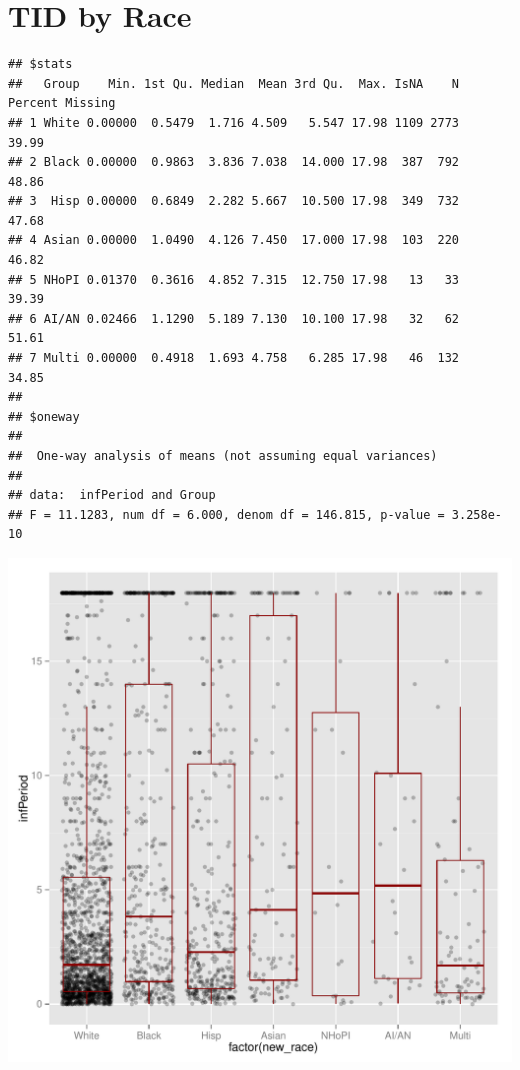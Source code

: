 \documentclass{article}\usepackage[]{graphicx}\usepackage[]{color}
\makeatletter
\def\maxwidth{ %
  \ifdim\Gin@nat@width>\linewidth
    \linewidth
  \else
    \Gin@nat@width
  \fi
}
\newenvironment{kframe}{%
 \def\at@end@of@kframe{}%
 \ifinner\ifhmode%
  \def\at@end@of@kframe{\end{minipage}}%
  \begin{minipage}{\columnwidth}%
 \fi\fi%
 \def\FrameCommand##1{\hskip\@totalleftmargin \hskip-\fboxsep
 \colorbox{shadecolor}{##1}\hskip-\fboxsep
     \hskip-\linewidth \hskip-\@totalleftmargin \hskip\columnwidth}%
 \MakeFramed {\advance\hsize-\width
   \@totalleftmargin\z@ \linewidth\hsize
   \@setminipage}}%
 {\par\unskip\endMakeFramed%
 \at@end@of@kframe}
\newenvironment{knitrout}{}{} %
\makeatother
\begin{document}
\section{TID by Race}

\begin{knitrout}\footnotesize
{}\color{fgcolor}\begin{kframe}
\begin{verbatim}
## $stats
##   Group    Min. 1st Qu. Median  Mean 3rd Qu.  Max. IsNA    N Percent Missing
## 1 White 0.00000  0.5479  1.716 4.509   5.547 17.98 1109 2773           39.99
## 2 Black 0.00000  0.9863  3.836 7.038  14.000 17.98  387  792           48.86
## 3  Hisp 0.00000  0.6849  2.282 5.667  10.500 17.98  349  732           47.68
## 4 Asian 0.00000  1.0490  4.126 7.450  17.000 17.98  103  220           46.82
## 5 NHoPI 0.01370  0.3616  4.852 7.315  12.750 17.98   13   33           39.39
## 6 AI/AN 0.02466  1.1290  5.189 7.130  10.100 17.98   32   62           51.61
## 7 Multi 0.00000  0.4918  1.693 4.758   6.285 17.98   46  132           34.85
## 
## $oneway
## 
## 	One-way analysis of means (not assuming equal variances)
## 
## data:  infPeriod and Group
## F = 11.1283, num df = 6.000, denom df = 146.815, p-value = 3.258e-10
\end{verbatim}


{\ttfamily\noindent\color{warningcolor}{\#\# Warning: Removed 2039 rows containing non-finite values (stat\_boxplot).\\\#\# Warning: Removed 2039 rows containing missing values (geom\_point).}}\end{kframe}

{\centering \includegraphics[width=\maxwidth]{figure/minimal-race} 

}



\end{knitrout}
\end{document}
